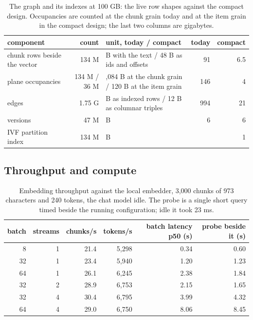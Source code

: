 \documentclass[11pt]{article}
\theoremstyle{plain}
\theoremstyle{definition}
\theoremstyle{remark}
\begin{document}
\begin{table}[t]
\centering
\caption{The graph and its indexes at 100 GB: the live row shapes against the compact design.
Occupancies are counted at the chunk grain today and at the item grain in the compact design;
the last two columns are gigabytes.}\label{tab:graph}
\footnotesize
\begin{tabular}{lr>{\raggedright\arraybackslash}p{4.8cm}rr}
\toprule
component & count & unit, today / compact & today & compact \\
\midrule
chunk rows beside the vector & 134 M & 679 B with the text / 48 B as ids and offsets & 91 & 6.5 \\
plane occupancies & 134 M / 36 M & 1,084 B at the chunk grain / 120 B at the item grain & 146 & 4 \\
edges & 1.75 G & 567 B as indexed rows / 12 B as columnar triples & 994 & 21 \\
versions & 47 M & 120 B & 6 & 6 \\
IVF partition index & 134 M & 8 B & & 1 \\
\bottomrule
\end{tabular}
\end{table}

\subsection{Throughput and compute}
\begin{table}[t]
\centering
\caption{Embedding throughput against the local embedder, 3,000 chunks of 973 characters and 240
tokens, the chat model idle. The probe is a single short query timed beside the running
configuration; idle it took 23 ms.}\label{tab:embed}
\small
\begin{tabular}{rrrrrr}
\toprule
batch & streams & chunks/s & tokens/s & batch latency p50 (s) & probe beside it (s) \\
\midrule
8 & 1 & 21.4 & 5,298 & 0.34 & 0.60 \\
32 & 1 & 23.4 & 5,940 & 1.20 & 1.23 \\
64 & 1 & 26.1 & 6,245 & 2.38 & 1.84 \\
32 & 2 & 28.9 & 6,753 & 2.15 & 1.65 \\
32 & 4 & 30.4 & 6,795 & 3.99 & 4.32 \\
64 & 4 & 29.0 & 6,750 & 8.06 & 8.45 \\
\bottomrule
\end{tabular}
\end{table}
\end{document}
